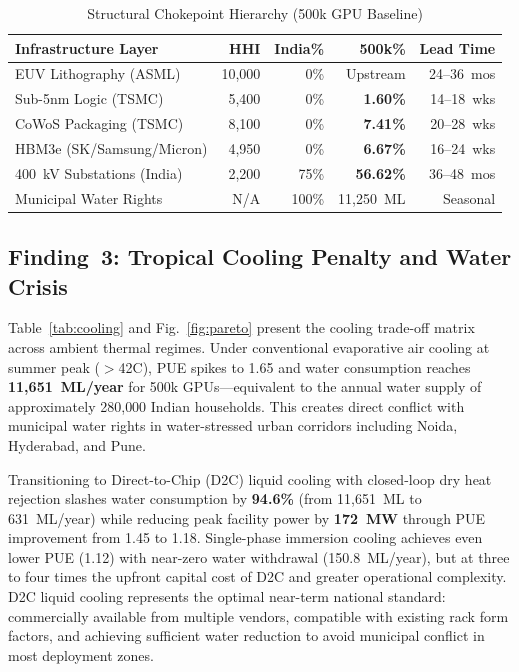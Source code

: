 \documentclass[conference]{IEEEtran}
\begin{document}
\begin{table}[t]
\centering
\caption{Structural Chokepoint Hierarchy (500k GPU Baseline)}
\label{tab:chokepoints}
\scriptsize
\begin{tabular*}{\columnwidth}{@{\extracolsep{\fill}}lrrrr@{}}
\toprule
\textbf{Infrastructure Layer} & \textbf{HHI} & \textbf{India\%} & \textbf{500k\%} & \textbf{Lead Time} \\
\midrule
EUV Lithography (ASML) & 10{,}000 & 0\% & Upstream & 24--36~mos \\
Sub-5nm Logic (TSMC) & 5{,}400 & 0\% & \textbf{1.60\%} & 14--18~wks \\
CoWoS Packaging (TSMC) & 8{,}100 & 0\% & \textbf{7.41\%} & 20--28~wks \\
HBM3e (SK/Samsung/Micron) & 4{,}950 & 0\% & \textbf{6.67\%} & 16--24~wks \\
400~kV Substations (India) & 2{,}200 & 75\% & \textbf{56.62\%} & 36--48~mos \\
Municipal Water Rights & N/A & 100\% & 11{,}250~ML & Seasonal \\
\bottomrule
\end{tabular*}
\end{table}

\subsection{Finding~3: Tropical Cooling Penalty and Water Crisis}

Table~\ref{tab:cooling} and Fig.~\ref{fig:pareto} present the cooling trade-off matrix across ambient thermal regimes. Under conventional evaporative air cooling at summer peak ($>$42\textdegree C), PUE spikes to 1.65 and water consumption reaches \textbf{11{,}651~ML/year} for 500k GPUs---equivalent to the annual water supply of approximately 280{,}000 Indian households. This creates direct conflict with municipal water rights in water-stressed urban corridors including Noida, Hyderabad, and Pune.

Transitioning to Direct-to-Chip (D2C) liquid cooling with closed-loop dry heat rejection slashes water consumption by \textbf{94.6\%} (from 11{,}651~ML to 631~ML/year) while reducing peak facility power by \textbf{172~MW} through PUE improvement from 1.45 to 1.18. Single-phase immersion cooling achieves even lower PUE (1.12) with near-zero water withdrawal (150.8~ML/year), but at three to four times the upfront capital cost of D2C and greater operational complexity. D2C liquid cooling represents the optimal near-term national standard: commercially available from multiple vendors, compatible with existing rack form factors, and achieving sufficient water reduction to avoid municipal conflict in most deployment zones.
\end{document}

